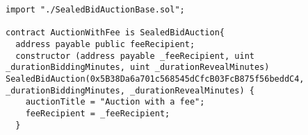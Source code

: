 \begin{lstlisting}[language=Solidity]
import "./SealedBidAuctionBase.sol";

contract AuctionWithFee is SealedBidAuction{
  address payable public feeRecipient;  
  constructor (address payable _feeRecipient, uint _durationBiddingMinutes, uint _durationRevealMinutes) SealedBidAuction(0x5B38Da6a701c568545dCfcB03FcB875f56beddC4, _durationBiddingMinutes, _durationRevealMinutes) {
    auctionTitle = "Auction with a fee";
    feeRecipient = _feeRecipient;
  }
\end{lstlisting}